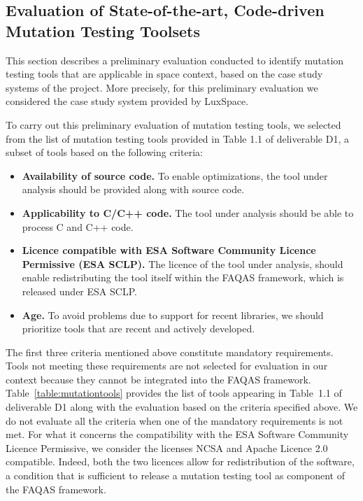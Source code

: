 \clearpage
\subsection{Evaluation of State-of-the-art, Code-driven Mutation Testing Toolsets}
\label{sec:toolsComparison}

This section describes a preliminary evaluation conducted to identify mutation testing tools that are applicable in space context, based on the case study systems of the project. More precisely, for this preliminary evaluation we considered the case study system provided by LuxSpace.

To carry out this preliminary evaluation of mutation testing tools, we selected from the list of mutation testing tools provided in Table 1.1 of deliverable D1, a subset of tools based on the following criteria:

\begin{itemize}
	\item \textbf{Availability of source code.} To enable optimizations, the tool under analysis should be provided along with source code.
	\item \textbf{Applicability to C/C++ code.} The tool under analysis should be able to process C and C++ code.
	\item \textbf{Licence compatible with ESA Software Community Licence Permissive (ESA SCLP).} The licence of the tool under analysis, should enable redistributing the tool itself within the FAQAS framework, which is released under ESA SCLP.
	\item \textbf{Age.} To avoid problems due to support for recent libraries, we should prioritize tools that are recent and actively developed.
\end{itemize}




The first three criteria mentioned above constitute mandatory requirements.
Tools not meeting these requirements are not selected for evaluation in our context because they cannot be integrated into the FAQAS framework.
Table~\ref{table:mutationtools} provides the list of tools appearing in Table~1.1 of deliverable D1 along with the evaluation based on the criteria specified above. We do not evaluate all the criteria when one of the mandatory requirements is not met.
For what it concerns the compatibility with the ESA Software Community Licence Permissive, we consider the licenses NCSA and Apache Licence 2.0 compatible.
Indeed, both the two licences allow for redistribution of the software, a condition that is sufficient to release a mutation testing tool as component of the FAQAS framework.

